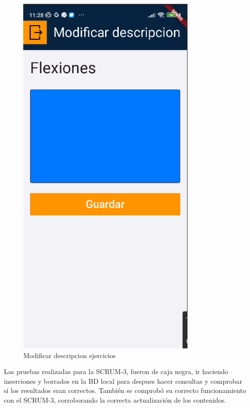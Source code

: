 \begin{figure}[H]
   \centering
    \includegraphics[width=0.8\textwidth]{pantallas/ModDescpEjer.png}
    \caption{Modificar descripcion ejercicios}
    \label{fig:ModDescpEjer}
\end{figure}

Las pruebas realizadas para la SCRUM-3, fueron de caja negra, ir haciendo inserciones y borrados en la BD local para despues hacer consultas y comprobar si los resultados eran correctos. También se comprobó su correcto funcionamiento con el SCRUM-3, corroborando la correcta actualización de los contenidos.


